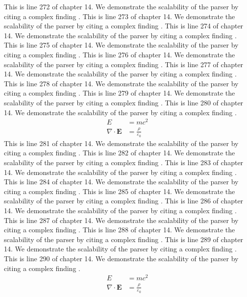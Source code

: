 This is line 272 of chapter 14. We demonstrate the scalability of the parser by citing a complex finding \cite{ref14_272}.
This is line 273 of chapter 14. We demonstrate the scalability of the parser by citing a complex finding \cite{ref14_273}.
This is line 274 of chapter 14. We demonstrate the scalability of the parser by citing a complex finding \cite{ref14_274}.
This is line 275 of chapter 14. We demonstrate the scalability of the parser by citing a complex finding \cite{ref14_275}.
This is line 276 of chapter 14. We demonstrate the scalability of the parser by citing a complex finding \cite{ref14_276}.
This is line 277 of chapter 14. We demonstrate the scalability of the parser by citing a complex finding \cite{ref14_277}.
This is line 278 of chapter 14. We demonstrate the scalability of the parser by citing a complex finding \cite{ref14_278}.
This is line 279 of chapter 14. We demonstrate the scalability of the parser by citing a complex finding \cite{ref14_279}.
This is line 280 of chapter 14. We demonstrate the scalability of the parser by citing a complex finding \cite{ref14_280}.
\begin{align*}
  E &= mc^2 \\
  \nabla \cdot \mathbf{E} &= \frac{\rho}{\varepsilon_0}
\end{align*}
This is line 281 of chapter 14. We demonstrate the scalability of the parser by citing a complex finding \cite{ref14_281}.
This is line 282 of chapter 14. We demonstrate the scalability of the parser by citing a complex finding \cite{ref14_282}.
This is line 283 of chapter 14. We demonstrate the scalability of the parser by citing a complex finding \cite{ref14_283}.
This is line 284 of chapter 14. We demonstrate the scalability of the parser by citing a complex finding \cite{ref14_284}.
This is line 285 of chapter 14. We demonstrate the scalability of the parser by citing a complex finding \cite{ref14_285}.
This is line 286 of chapter 14. We demonstrate the scalability of the parser by citing a complex finding \cite{ref14_286}.
This is line 287 of chapter 14. We demonstrate the scalability of the parser by citing a complex finding \cite{ref14_287}.
This is line 288 of chapter 14. We demonstrate the scalability of the parser by citing a complex finding \cite{ref14_288}.
This is line 289 of chapter 14. We demonstrate the scalability of the parser by citing a complex finding \cite{ref14_289}.
This is line 290 of chapter 14. We demonstrate the scalability of the parser by citing a complex finding \cite{ref14_290}.
\begin{align*}
  E &= mc^2 \\
  \nabla \cdot \mathbf{E} &= \frac{\rho}{\varepsilon_0}
\end{align*}
